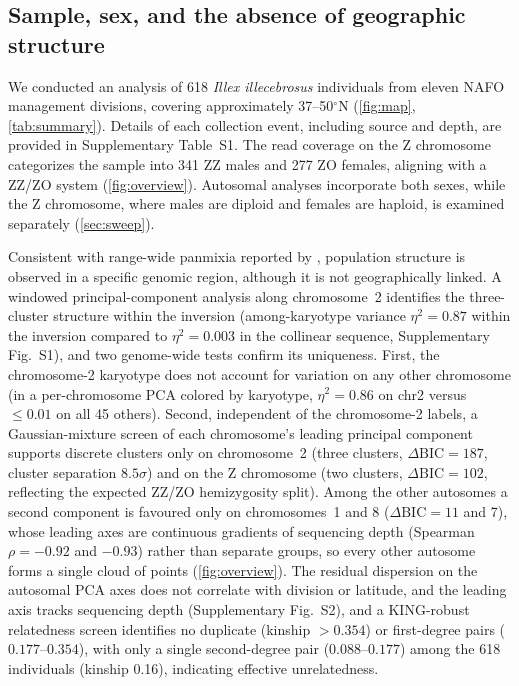 \documentclass[11pt]{article}
\newcommand{\illex}{\textit{Illex illecebrosus}}
\begin{document}
\subsection{Sample, sex, and the absence of geographic structure}
We conducted an analysis of 618 \illex{} individuals from eleven NAFO management divisions, covering approximately 37--50$^\circ$N (\cref{fig:map}, \cref{tab:summary}). Details of each collection event, including source and depth, are provided in Supplementary Table~S1. The read coverage on the Z chromosome categorizes the sample into 341 ZZ males and 277 ZO females, aligning with a ZZ/ZO system \citep{coffing2025,small2026} (\cref{fig:overview}). Autosomal analyses incorporate both sexes, while the Z chromosome, where males are diploid and females are haploid, is examined separately (\cref{sec:sweep}).

Consistent with range-wide panmixia reported by \citet{baker2025}, population structure is observed in a specific genomic region, although it is not geographically linked. A windowed principal-component analysis along chromosome~2 identifies the three-cluster structure within the inversion (among-karyotype variance $\eta^{2}=0.87$ within the inversion compared to $\eta^{2}=0.003$ in the collinear sequence, Supplementary Fig.~S1), and two genome-wide tests confirm its uniqueness. First, the chromosome-2 karyotype does not account for variation on any other chromosome (in a per-chromosome PCA colored by karyotype, $\eta^{2}=0.86$ on chr2 versus $\leq0.01$ on all 45 others). Second, independent of the chromosome-2 labels, a Gaussian-mixture screen of each chromosome's leading principal component supports discrete clusters only on chromosome~2 (three clusters, $\Delta\mathrm{BIC}=187$, cluster separation $8.5\sigma$) and on the Z chromosome (two clusters, $\Delta\mathrm{BIC}=102$, reflecting the expected ZZ/ZO hemizygosity split). Among the other autosomes a second component is favoured only on chromosomes~1 and 8 ($\Delta\mathrm{BIC}=11$ and 7), whose leading axes are continuous gradients of sequencing depth (Spearman $\rho=-0.92$ and $-0.93$) rather than separate groups, so every other autosome forms a single cloud of points (\cref{fig:overview}). The residual dispersion on the autosomal PCA axes does not correlate with division or latitude, and the leading axis tracks sequencing depth (Supplementary Fig.~S2), and a KING-robust relatedness screen \citep{manichaikul2010} identifies no duplicate (kinship $>0.354$) or first-degree pairs ($0.177$--$0.354$), with only a single second-degree pair ($0.088$--$0.177$) among the 618 individuals (kinship 0.16), indicating effective unrelatedness.
\end{document}
